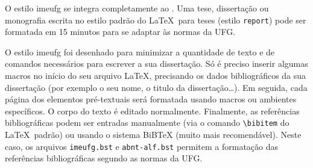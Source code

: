 O estilo \textsf{imeufg} se integra completamente ao \LaTeXe. Uma tese, dissertação ou monografia escrita no estilo padrão do \LaTeX\ para teses (estilo \verb|report|) pode ser formatada em 15 minutos para se adaptar às normas da UFG.

O estilo \textsf{imeufg} foi desenhado para minimizar a quantidade de texto e de comandos necessários para escrever a sua dissertação. Só é preciso inserir algumas macros no início do seu arquivo \LaTeX, precisando os dados bibliográficos da sua dissertação (por exemplo o seu nome, o titulo da dissertação\ldots). Em seguida, cada página dos elementos pré-textuais será formatada usando macros ou ambientes específicos. O corpo do texto é editado normalmente. Finalmente, as referências bibliográficas podem ser entradas manualmente (via o comando \verb|\bibitem| do \LaTeX\ padrão) ou usando o sistema BiBTeX (muito mais recomendável). Neste caso, os arquivos \verb|imeufg.bst| e \verb|abnt-alf.bst| permitem a formatação das referências bibliográficas segundo as normas da UFG.

